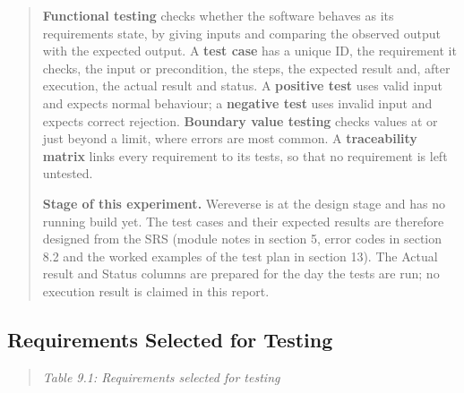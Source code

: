 \documentclass[12pt,a4paper]{article}
\begin{document}
\begin{quote}
\textbf{Functional testing} checks whether the software behaves as its
requirements state, by giving inputs and comparing the observed output
with the expected output. A \textbf{test case} has a unique ID, the
requirement it checks, the input or precondition, the steps, the
expected result and, after execution, the actual result and status. A
\textbf{positive test} uses valid input and expects normal behaviour; a
\textbf{negative test} uses invalid input and expects correct rejection.
\textbf{Boundary value testing} checks values at or just beyond a limit,
where errors are most common. A \textbf{traceability matrix} links every
requirement to its tests, so that no requirement is left untested.

\textbf{Stage of this experiment.} Wereverse is at the design stage and
has no running build yet. The test cases and their expected results are
therefore designed from the SRS (module notes in section 5, error codes
in section 8.2 and the worked examples of the test plan in section 13).
The Actual result and Status columns are prepared for the day the tests
are run; no execution result is claimed in this report.
\end{quote}

\subsection{Requirements Selected for
Testing}\label{requirements-selected-for-testing}

\begin{quote}
\emph{Table 9.1: Requirements selected for testing}
\end{quote}
\end{document}
